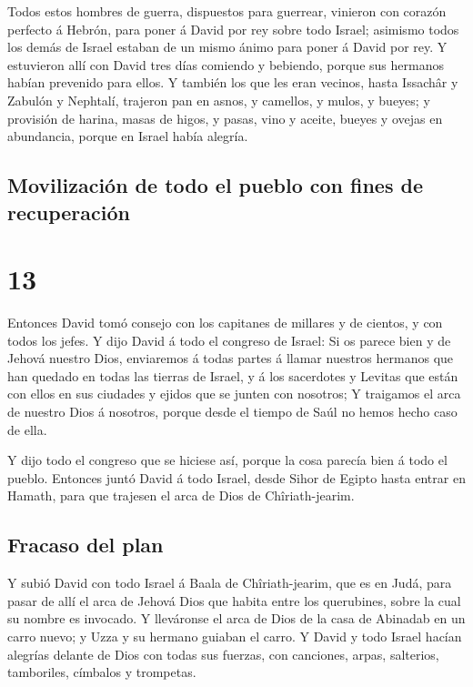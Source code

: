  Todos estos hombres de guerra, dispuestos para guerrear,
vinieron con corazón perfecto á Hebrón, para poner á David por rey sobre
todo Israel; asimismo todos los demás de Israel estaban de un mismo
ánimo para poner á David por rey.  Y estuvieron allí con
David tres días comiendo y bebiendo, porque sus hermanos habían
prevenido para ellos.  Y también los que les eran
vecinos, hasta Issachâr y Zabulón y Nephtalí, trajeron pan en asnos, y
camellos, y mulos, y bueyes; y provisión de harina, masas de higos, y
pasas, vino y aceite, bueyes y ovejas en abundancia, porque en Israel
había alegría.

\hypertarget{movilizaciuxf3n-de-todo-el-pueblo-con-fines-de-recuperaciuxf3n}{%
\subsection{Movilización de todo el pueblo con fines de
recuperación}\label{movilizaciuxf3n-de-todo-el-pueblo-con-fines-de-recuperaciuxf3n}}

\hypertarget{section-13-13}{%
\section{13}\label{section-13-13}}

 Entonces David tomó consejo con los capitanes de millares
y de cientos, y con todos los jefes.  Y dijo David á todo
el congreso de Israel: Si os parece bien y de Jehová nuestro Dios,
enviaremos á todas partes á llamar nuestros hermanos que han quedado en
todas las tierras de Israel, y á los sacerdotes y Levitas que están con
ellos en sus ciudades y ejidos que se junten con nosotros;
 Y traigamos el arca de nuestro Dios á nosotros, porque
desde el tiempo de Saúl no hemos hecho caso de ella.

 Y dijo todo el congreso que se hiciese así, porque la
cosa parecía bien á todo el pueblo.  Entonces juntó David
á todo Israel, desde Sihor de Egipto hasta entrar en Hamath, para que
trajesen el arca de Dios de Chîriath-jearim.

\hypertarget{fracaso-del-plan}{%
\subsection{Fracaso del plan}\label{fracaso-del-plan}}

 Y subió David con todo Israel á Baala de Chîriath-jearim,
que es en Judá, para pasar de allí el arca de Jehová Dios que habita
entre los querubines, sobre la cual su nombre es invocado.
 Y lleváronse el arca de Dios de la casa de Abinadab en un
carro nuevo; y Uzza y su hermano guiaban el carro.  Y
David y todo Israel hacían alegrías delante de Dios con todas sus
fuerzas, con canciones, arpas, salterios, tamboriles, címbalos y
trompetas.

